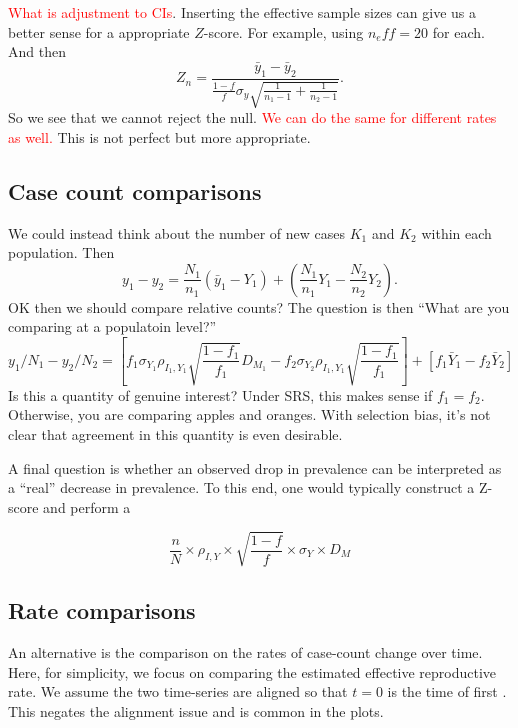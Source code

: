 \documentclass[aoas]{amsart}
\begin{document}
\textcolor{red}{What is adjustment to CIs}.   Inserting the effective sample sizes can give us a better sense for a appropriate $Z$-score.  For example, using $n_eff = 20$ for each. And then
$$
Z_n = \frac{\bar y_1 - \bar y_2}{ \frac{1-f}{f} \sigma_y \sqrt{ \frac{1}{n_1 - 1} + \frac{1}{n_2 - 1}}}.
$$
So we see that we cannot reject the null. \textcolor{red}{We can do the same for different rates as well.}  This is not perfect but more appropriate.

\subsection{Case count comparisons}

We could instead think about the number of new cases $K_1$ and $K_2$ within each population.  Then
$$
y_1 - y_2 = \frac{N_1}{n_1} ( \bar y_1 - Y_{1}) + \left( \frac{N_1}{n_1} Y_{1} - \frac{N_2}{n_2} Y_2  \right).
$$
OK then we should compare relative counts?
The question is then ``What are you comparing at a populatoin level?''
$$
y_1/N_1 - y_2/ N_2 = \left[ f_1 \sigma_{Y_1} \rho_{I_1, Y_1} \sqrt{\frac{1-f_1}{f_1}} D_{M_1} - f_2 \sigma_{Y_2} \rho_{I_1, Y_1} \sqrt{\frac{1-f_1}{f_1}}  \right] + \left[ f_1 \bar Y_1 - f_2 \bar Y_2 \right]
$$
Is this a quantity of genuine interest? Under SRS, this makes sense if $f_1 = f_2$.  Otherwise, you are comparing apples and oranges.  With selection bias, it's not clear that agreement in this quantity is even desirable.

A final question is whether an observed drop in prevalence can be interpreted as a ``real'' decrease in prevalence.  To this end, one would typically construct a Z-score and perform a


$$
\frac{n}{N} \times \rho_{I,Y} \times \sqrt{\frac{1-f}{f}} \times \sigma_{Y} \times D_M
$$

\subsection{Rate comparisons}

An alternative is the comparison on the rates of case-count change over time.  Here, for simplicity, we focus on comparing the estimated effective reproductive rate.  We assume the two time-series are aligned so that $t=0$ is the time of first .  This negates the alignment issue and is common in the plots.
\end{document}
